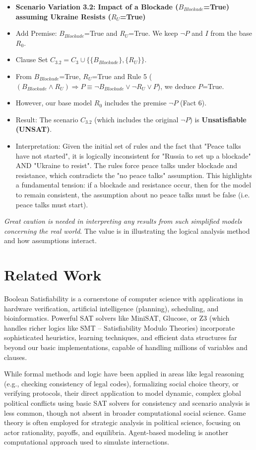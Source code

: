 \documentclass[11pt, a4paper]{article}
\begin{document}
\begin{itemize}
    \item \textbf{Scenario Variation 3.2: Impact of a Blockade ($B_{Blockade}$=True) assuming Ukraine Resists ($R_U$=True)}
        \item Add Premise: $B_{Blockade}$=True and $R_U$=True. We keep $\neg P$ and $I$ from the base $R_0$.
        \item Clause Set $C_{3.2} = C_3 \cup \{\{B_{Blockade}\}, \{R_U\}\}$.
        \item From $B_{Blockade}$=True, $R_U$=True and Rule 5 ($(B_{Blockade} \wedge R_U) \Rightarrow P \equiv \neg B_{Blockade} \vee \neg R_U \vee P$), we deduce $P$=True.
        \item However, our base model $R_0$ includes the premise $\neg P$ (Fact 6).
        \item Result: The scenario $C_{3.2}$ (which includes the original $\neg P$) is \textbf{Unsatisfiable (UNSAT)}.
        \item Interpretation: Given the initial set of rules and the fact that "Peace talks have not started", it is logically inconsistent for "Russia to set up a blockade" AND "Ukraine to resist". The rules force peace talks under blockade and resistance, which contradicts the "no peace talks" assumption. This highlights a fundamental tension: if a blockade and resistance occur, then for the model to remain consistent, the assumption about no peace talks must be false (i.e. peace talks must start).
\end{itemize}
\textit{Great caution is needed in interpreting any results from such simplified models concerning the real world}. The value is in illustrating the logical analysis method and how assumptions interact.

\section{Related Work} \label{sec:relatedwork}

Boolean Satisfiability is a cornerstone of computer science with applications in hardware verification, artificial intelligence (planning), scheduling, and bioinformatics. Powerful SAT solvers like MiniSAT, Glucose, or Z3 (which handles richer logics like SMT – Satisfiability Modulo Theories) incorporate sophisticated heuristics, learning techniques, and efficient data structures far beyond our basic implementations, capable of handling millions of variables and clauses.

While formal methods and logic have been applied in areas like legal reasoning (e.g., checking consistency of legal codes), formalizing social choice theory, or verifying protocols, their direct application to model dynamic, complex global political conflicts using basic SAT solvers for consistency and scenario analysis is less common, though not absent in broader computational social science. Game theory is often employed for strategic analysis in political science, focusing on actor rationality, payoffs, and equilibria. Agent-based modeling is another computational approach used to simulate interactions.
\end{document}
